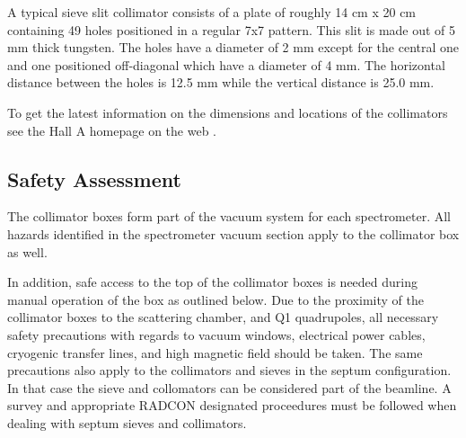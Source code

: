 A typical sieve slit collimator 
consists of a plate of roughly 14 cm x 20 cm containing 49 holes
positioned in a regular 7x7 pattern. This slit is made out of 5
mm thick tungsten.
The holes have a diameter of 2 mm except for the central one and one positioned
off-diagonal which have a diameter of 4 mm. The horizontal distance between the
holes is 12.5 mm while the vertical distance is 25.0 mm.
%

To get the latest information on the dimensions and locations of the collimators see 
the Hall A homepage on the web%
.

\begin{safetyen}{10}{15}
\subsection{Safety Assessment}

The collimator boxes form part of the vacuum system for each spectrometer. All hazards
identified in the spectrometer vacuum section apply to the collimator box as well.

In addition, safe access to the top of
the collimator boxes is needed  during manual operation of the box as outlined below.
Due to the proximity of the collimator boxes to the scattering chamber, and Q1 quadrupoles,
all necessary safety precautions with regards to vacuum windows, electrical power cables, 
cryogenic transfer lines, and high magnetic field should be taken. The same precautions also apply 
to the collimators and sieves in the septum configuration. In that case the sieve and collomators
can be considered part of the beamline. A survey and
appropriate RADCON designated proceedures must be followed when dealing with septum sieves 
and collimators.
\end{safetyen}


